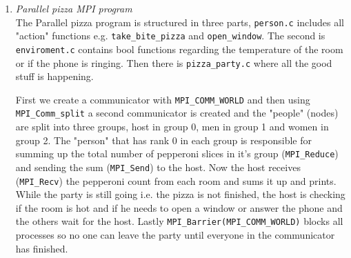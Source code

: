 \documentclass[fontsize=14pt,a4paper]{scrartcl}
\begin{document}
\begin{enumerate}
\begin{enumerate}[label*=\arabic*.]
    \item
    \textit{Parallel pizza MPI program}\\
    
    The Parallel pizza program is structured in three parts, \texttt{person.c} includes all "action" functions e.g. \texttt{take\_bite\_pizza} and \texttt{open\_window}. The second is \texttt{enviroment.c} contains bool functions regarding the temperature of the room or if the phone is ringing. Then there is \texttt{pizza\_party.c} where all the good stuff is happening. 
    
First we create a communicator with \texttt{MPI\_COMM\_WORLD} and then using \texttt{MPI\_Comm\_split} a second communicator is created and the "people" (nodes) are split into three groups, host in group 0, men in group 1 and women in group 2. The "person" that has rank 0 in each group is responsible for summing up the total number of pepperoni slices in it's group (\texttt{MPI\_Reduce}) and sending the sum (\texttt{MPI\_Send}) to the host. Now the host receives (\texttt{MPI\_Recv}) the pepperoni count from each room and sums it up and prints. While the party is still going i.e. the pizza is not finished, the host is checking if the room is hot and if he needs to open a window or answer the phone and the others wait for the host. Lastly \texttt{MPI\_Barrier(MPI\_COMM\_WORLD)} blocks all processes so no one can leave the party until everyone in the communicator has finished. 

    \end{enumerate}
\end{enumerate}
\end{document}
